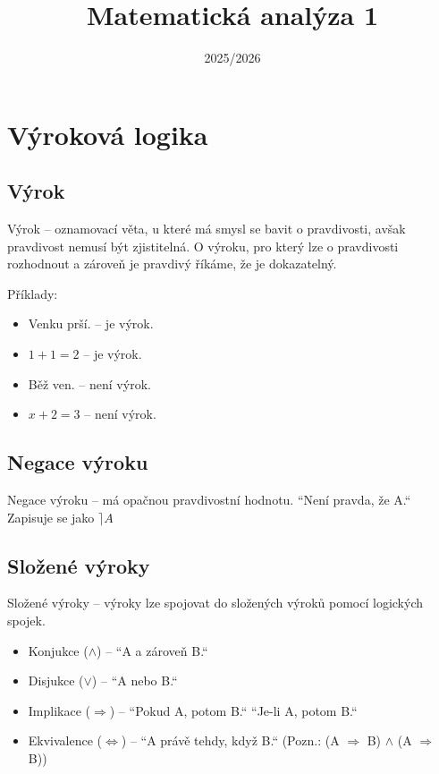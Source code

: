 \documentclass[12pt, a4paper]{scrartcl}
\title{Matematická analýza 1}
\date{2025/2026}
\begin{document}
    \maketitle

    \tableofcontents

    \section{Výroková logika}
    \subsection{Výrok}
    Výrok -- oznamovací věta, u které má smysl se bavit o pravdivosti, 
    avšak pravdivost nemusí být zjistitelná. O výroku, pro který lze 
    o pravdivosti rozhodnout a zároveň je pravdivý říkáme, že je dokazatelný.

    Příklady:
    \begin{itemize}
        \item{Venku prší. -- je výrok.}
        \item{$1 + 1 = 2$ -- je výrok.}
        \item{Běž ven. -- není výrok.}
        \item{$x + 2 = 3$ -- není výrok.}   
    \end{itemize}

    \subsection{Negace výroku}
    Negace výroku -- má opačnou pravdivostní hodnotu.
    ``Není pravda, že A.`` Zapisuje se jako $\rceil A$
    
    \subsection{Složené výroky}
    Složené výroky -- výroky lze spojovat do složených výroků pomocí logických spojek.

    \begin{itemize}
        \item{Konjukce ($\wedge$) -- ``A a zároveň B.``}
        \item{Disjukce ($\vee$) -- ``A nebo B.``}
        \item{Implikace ($\Rightarrow$) -- ``Pokud A, potom B.`` ``Je-li A, potom B.``}
        \item{Ekvivalence ($\Leftrightarrow$) -- ``A právě tehdy, když B.`` (Pozn.: (A $\Rightarrow$ B) $\wedge$ (A $\Rightarrow$ B))}
    \end{itemize}
\end{document}
